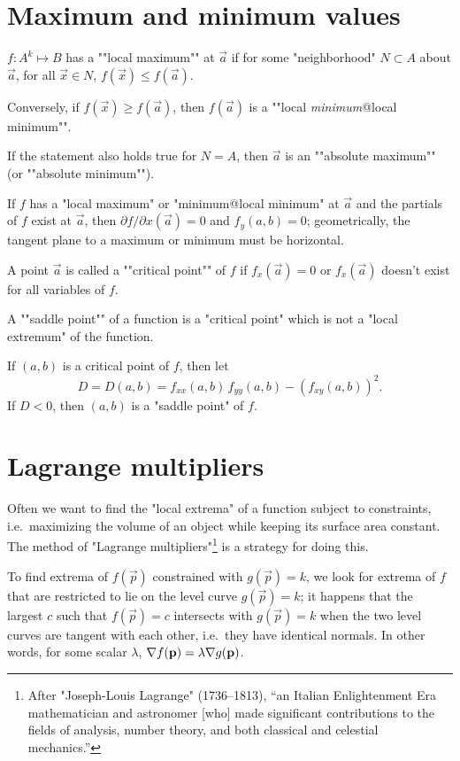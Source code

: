 \documentclass[knowledge]{mathnotes}
\begin{document}
\section{Maximum and minimum values}
\begin{defn}
  $f : A^k \mapsto B$ has a ""local maximum"" at $\vec a$ if for some
  "neighborhood" $N \subset A$ about $\vec a$, for all $\vec x \in N$,
  $f(\vec x) \le f(\vec a)$.

  Conversely, if $f(\vec x) \ge f(\vec a)$, then $f(\vec a)$ is a ""local
  \emph{minimum}@local minimum"".

  If the statement also holds true for $N = A$, then $\vec a$ is an
  ""absolute maximum"" (or ""absolute minimum"").
\end{defn}

If $f$ has a "local maximum" or "minimum@local minimum" at $\vec a$ and the
partials of $f$ exist at $\vec a$, then $\partial f/\partial x (\vec a) = 0$
and $f_y(a, b) = 0$; geometrically, the tangent plane to a maximum or
minimum must be horizontal.

\begin{defn}
  A point $\vec a$ is called a ""critical point"" of $f$ if $f_x(\vec a) =
  0$ or $f_x(\vec a)$ doesn't exist for all variables of $f$.
\end{defn}

\begin{defn}
  A ""saddle point"" of a function is a "critical point" which is not a
  "local extremum" of the function.
\end{defn}

If $(a, b)$ is a critical point of $f$, then let
\[D = D(a, b) = f_{xx} (a,b) \, f_{yy} (a,b) - (f_{xy}(a,b))^2.\]
If $D < 0$, then $(a, b)$ is a "saddle point" of $f$.

\section{Lagrange multipliers}
Often we want to find the "local extrema" of a function subject to
constraints, i.e.~maximizing the volume of an object while keeping its
surface area constant. The method of "Lagrange multipliers"\footnote{After
"Joseph-Louis Lagrange" (1736--1813), ``an Italian Enlightenment Era
mathematician and astronomer [who] made significant contributions to the
fields of analysis, number theory, and both classical and celestial
mechanics.''} is a strategy for doing this.

To find extrema of $f(\vec p)$ constrained with $g(\vec p) = k$,
we look for extrema of $f$ that are restricted to lie on the level curve
$g(\vec p) = k$; it happens that the largest $c$ such that $f(\vec p) = c$
intersects with  $g(\vec p) = k$ when the two level curves are tangent with
each other, i.e.~they have identical normals. In other words, for some
scalar $\lambda$, $\nabla f(\mathbf{p}) = \lambda \nabla g(\mathbf{p})$.
\end{document}
